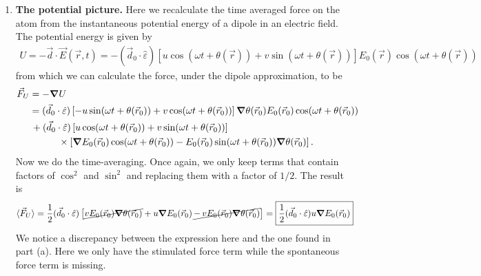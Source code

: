 \documentclass{article}
\theoremstyle{definition}
\newcommand{\f}[2]{\frac{#1}{#2}}
\newcommand{\lb}{\left[}
\newcommand{\rb}{\right]}
\begin{document}
\begin{enumerate}[label=\alph*)]
	\item \textbf{The potential picture.} Here we recalculate the time averaged force on the atom from the instantaneous potential energy of a dipole in an electric field. The potential energy is given by 
	\begin{align*}
	U = -\vec{d}\cdot \vec{E}(\vec{r},t) = -(\vec{d}_0 \cdot \hat{\varepsilon})     \lb u \cos(\omega t + \theta(\vec{r}))  + v\sin(\omega t + \theta(\vec{r})) \rb   E_0(\vec{r}) \cos(\omega t + \theta(\vec{r}))
	\end{align*} 
	from which we can calculate the force, under the dipole approximation, to be 
	\begin{align*}
	\vec{F}_{U} &= -\grad U \\
	&= (\vec{d}_0\cdot \hat{\varepsilon}) \lb - u\sin(\omega t + \theta(\vec{r}_0)) + v \cos(\omega t + \theta(\vec{r}_0) ) \rb  \grad \theta(\vec{r}_0) E_0(\vec{r}_0) \cos(\omega t + \theta(\vec{r}_0)) \\
	& \,+ (\vec{d}_0\cdot \hat{\varepsilon}) \lb u \cos(\omega t + \theta(\vec{r}_0))  + v\sin(\omega t + \theta(\vec{r}_0)) \rb \\
	&\quad\quad\quad  \times \lb \grad E_0(\vec{r}_0)  \cos(\omega t + \theta(\vec{r}_0)) - E_0(\vec{r}_0)\sin (\omega t  + \theta(\vec{r}_0)) \grad \theta(\vec{r}_0)\rb.
	\end{align*}
	Now we do the time-averaging. Once again, we only keep terms that contain factors of $\cos^2$ and $\sin^2$ and replacing them with a factor of $1/2$. The result is 
	\begin{align*}
	\langle \vec{F}_U\rangle 
	&= \f{1}{2}(\vec{d}_0\cdot \hat{\varepsilon}) \lb \cancel{v E_0(\vec{r}_0) \grad \theta(\vec{r}_0) } + u\grad E_0(\vec{r}_0) \, \cancel{- \,v E_0(\vec{r}_0)\grad \theta (\vec{r}_0) }\rb = \boxed{\f{1}{2}(\vec{d}_0\cdot \hat{\varepsilon})  u \grad E_0(\vec{r}_0) }
	\end{align*}
	We notice a discrepancy between the expression here and the one found in part (a). Here we only have the stimulated force term while the spontaneous force term is missing. \\
	

\end{enumerate}
\end{document}
